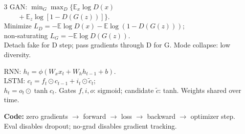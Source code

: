\documentclass[9pt]{extarticle}
\newcommand{\E}{\mathbb E}
\begin{document}
\begin{multicols*}{3}
GAN: $\min_G\max_D\{\E_x\log D(x)$\\
$\qquad+\E_z\log[1-D(G(z))]\}$.\\
Minimize $L_D=-\E\log D(x)-\E\log(1-D(G(z)))$;\\
non-saturating $L_G=-\E\log D(G(z))$.\\
Detach fake for D step; pass gradients through D for G. Mode collapse: low diversity.

RNN: $h_t=\phi(W_xx_t+W_hh_{t-1}+b)$.\\
LSTM: $c_t=f_t\odot c_{t-1}+i_t\odot\tilde c_t$;\\
$h_t=o_t\odot\tanh c_t$. Gates $f,i,o$: sigmoid; candidate $\tilde c$: tanh. Weights shared over time.

\textbf{Code:} zero gradients $\to$ forward $\to$ loss $\to$ backward $\to$ optimizer step. Eval disables dropout; no-grad disables gradient tracking.
\end{multicols*}
\end{document}
